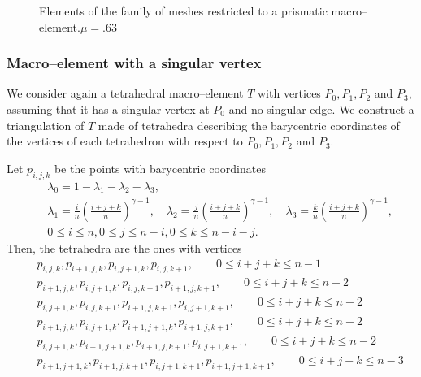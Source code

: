 \def\col{black}
\def\height{0}
\def\twoPi{360}
\begin{figure}[!h]\centering
  \subfloat
  {
    \hspace{1cm}
    \hspace{1cm}
  }
  \caption{Elements of the family of
    meshes restricted to a prismatic macro--element.$\mu = .63$}
  \label{prismatic_macroelements}
\end{figure}

\subsubsection{Macro--element with a singular vertex}

We consider again a tetrahedral macro--element $T$ with vertices $P_0, P_1, P_2$
and $P_3$, assuming that it has a singular vertex at $P_0$ and no singular edge.
We construct a triangulation of $T$ made of tetrahedra describing 
the barycentric coordinates of the vertices of each tetrahedron with respect
to $P_0, P_1, P_2$ and $P_3$. %

Let $p_{i,j,k}$ be the points with barycentric coordinates
\begin{eqnarray*}
&&\lambda_0=1-\lambda_1-\lambda_2-\lambda_3,\\[5pt]
&&\lambda_1=\frac in\left(\frac{i+j+k}n\right)^{\gamma-1},\quad
  \lambda_2=\frac jn\left(\frac{i+j+k}n\right)^{\gamma-1},\quad
  \lambda_3=\frac kn\left(\frac{i+j+k}n\right)^{\gamma-1},
\\[5pt] &&0\le i\le n, 0\le j\le n-i, 0\le k\le n-i-j.
\end{eqnarray*}
Then, the tetrahedra are the ones with vertices
\begin{eqnarray*}
&& p_{i,j,k}, p_{i+1,j,k}, p_{i,j+1,k}, p_{i,j,k+1}, \qquad 0\le i+j+k\le n-1\\
&& p_{i+1,j,k}, p_{i,j+1,k}, p_{i,j,k+1}, p_{i+1,j,k+1}, \qquad 0\le i+j+k\le n-2\\
&& p_{i,j+1,k}, p_{i,j,k+1}, p_{i+1,j,k+1}, p_{i,j+1,k+1}, \qquad 0\le i+j+k\le n-2\\
&& p_{i+1,j,k}, p_{i,j+1,k}, p_{i+1,j+1,k}, p_{i+1,j,k+1}, \qquad 0\le i+j+k\le n-2\\
&& p_{i,j+1,k}, p_{i+1,j+1,k}, p_{i+1,j,k+1}, p_{i,j+1,k+1}, \qquad 0\le i+j+k\le n-2\\
&& p_{i+1,j+1,k}, p_{i+1,j,k+1}, p_{i,j+1,k+1}, p_{i+1,j+1,k+1}, \qquad 0\le i+j+k\le n-3
\end{eqnarray*}


